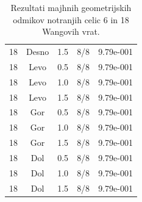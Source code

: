 \documentclass[12pt,a4paper]{article}
\begin{document}
\begin{table}[H]
\begin{minipage}{0.49\textwidth}
{\begin{tabular}{|c|c|c|c|c|}
                18 & Desno & 1.5 & 8/8 & 9.79e-001 \\
                18 & Levo & 0.5 & 8/8 & 9.79e-001 \\
                18 & Levo & 1.0 & 8/8 & 9.79e-001 \\
                18 & Levo & 1.5 & 8/8 & 9.79e-001 \\
                18 & Gor & 0.5 & 8/8 & 9.79e-001 \\
                18 & Gor & 1.0 & 8/8 & 9.79e-001 \\
                18 & Gor & 1.5 & 8/8 & 9.79e-001 \\
                18 & Dol & 0.5 & 8/8 & 9.79e-001 \\
                18 & Dol & 1.0 & 8/8 & 9.79e-001 \\
                18 & Dol & 1.5 & 8/8 & 9.79e-001 \\
                \hline
            \end{tabular}
        }
    \end{minipage}

    \caption{Rezultati majhnih geometrijskih odmikov notranjih celic 6 in 18 Wangovih vrat.}
    \label{g18:tab:wang-notranje-6-18}
\end{table}
\end{document}
